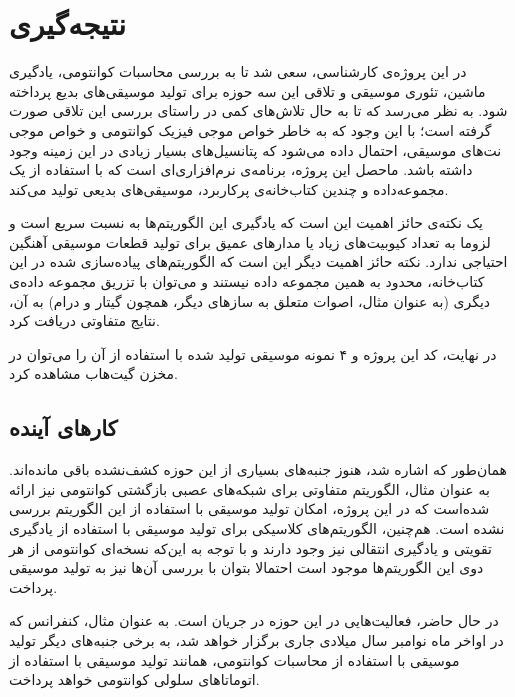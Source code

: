 \chapter{نتیجه‌گیری}

در این پروژه‌ی کارشناسی، سعی شد تا به بررسی محاسبات کوانتومی، یادگیری ماشین، تئوری موسیقی و تلاقی این سه حوزه برای تولید موسیقی‌های بدیع پرداخته شود. به نظر می‌رسد که تا به حال تلاش‌های کمی در راستای بررسی این تلاقی صورت گرفته است؛ با این وجود که به خاطر خواص موجی فیزیک کوانتومی و خواص موجی نت‌های موسیقی، احتمال داده می‌شود که پتانسیل‌های بسیار زیادی در این زمینه وجود داشته باشد.
ماحصل این پروژه، برنامه‌ی نرم‌افزاری‌ای است که با استفاده از یک مجموعه‌داده و چندین کتاب‌خانه‌ی پرکاربرد، موسیقی‌های بدیعی تولید می‌کند.

یک نکته‌ی حائز اهمیت این است که یادگیری این الگوریتم‌ها به نسبت سریع است و لزوما به تعداد کیوبیت‌های زیاد یا مدارهای عمیق برای تولید قطعات موسیقی آهنگین احتیاجی ندارد.
نکته حائز اهمیت دیگر این است که الگوریتم‌های پیاده‌سازی شده در این کتاب‌خانه، محدود به همین مجموعه داده نیستند و می‌توان با تزریق مجموعه داده‌ی دیگری (به عنوان مثال، اصوات متعلق به سازهای دیگر، همچون گیتار و درام) به آن، نتایج متفاوتی دریافت کرد.

در نهایت، کد این پروژه و ۴ نمونه موسیقی تولید شده با استفاده از آن را می‌توان در مخزن گیت‌هاب
\cite{Maqenta}
مشاهده کرد.

\section{کارهای آینده}
همان‌طور که اشاره شد، هنوز جنبه‌های بسیاری از این حوزه کشف‌نشده باقی مانده‌اند. به عنوان مثال، الگوریتم متفاوتی
\cite{bausch2020recurrent}
برای شبکه‌های عصبی بازگشتی کوانتومی نیز ارائه شده‌است که در این پروژه، امکان تولید موسیقی با استفاده از این الگوریتم بررسی نشده است. هم‌چنین، الگوریتم‌های کلاسیکی برای تولید موسیقی با استفاده از یادگیری تقویتی و یادگیری انتقالی نیز وجود دارند و با توجه به این‌که نسخه‌ای کوانتومی از هر دوی این الگوریتم‌ها موجود است
\cite{Mari_qtransfer}
\cite{Daoyi_QReinforce}
احتمالا بتوان با بررسی آن‌ها نیز به تولید موسیقی پرداخت.

در حال حاضر، فعالیت‌هایی در این حوزه در جریان است. به عنوان مثال، کنفرانس
\cite{ISQCMC}
که در اواخر ماه نوامبر سال میلادی جاری برگزار خواهد شد، به برخی جنبه‌های دیگر تولید موسیقی با استفاده از محاسبات کوانتومی، همانند
تولید موسیقی با استفاده از اتوماتاهای سلولی کوانتومی خواهد پرداخت.
